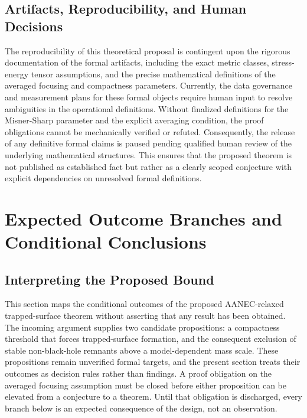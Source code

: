 \documentclass[conference]{IEEEtran}
\begin{document}
\subsection{Artifacts, Reproducibility, and Human Decisions}
The reproducibility of this theoretical proposal is contingent upon the rigorous documentation of the formal artifacts, including the exact metric classes, stress-energy tensor assumptions, and the precise mathematical definitions of the averaged focusing and compactness parameters. Currently, the data governance and measurement plans for these formal objects require human input to resolve ambiguities in the operational definitions. Without finalized definitions for the Misner-Sharp parameter and the explicit averaging condition, the proof obligations cannot be mechanically verified or refuted. Consequently, the release of any definitive formal claims is paused pending qualified human review of the underlying mathematical structures. This ensures that the proposed theorem is not published as established fact but rather as a clearly scoped conjecture with explicit dependencies on unresolved formal definitions.

\section{Expected Outcome Branches and Conditional Conclusions}
\subsection{Interpreting the Proposed Bound}
This section maps the conditional outcomes of the proposed AANEC-relaxed trapped-surface theorem without asserting that any result has been obtained. The incoming argument supplies two candidate propositions: a compactness threshold that forces trapped-surface formation, and the consequent exclusion of stable non-black-hole remnants above a model-dependent mass scale. These propositions remain unverified formal targets, and the present section treats their outcomes as decision rules rather than findings. A proof obligation on the averaged focusing assumption must be closed before either proposition can be elevated from a conjecture to a theorem. Until that obligation is discharged, every branch below is an expected consequence of the design, not an observation.
\end{document}
